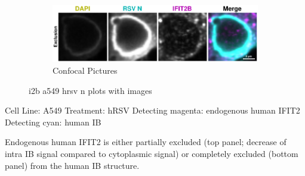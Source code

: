 \begin{figure}
    \begin{subfigure}{1\textwidth}
    \includegraphics[width=1\linewidth]{10. Chapter 5/Figs/01. Infection/02. IFIT2B/03. i2b a549 hrsv n.pdf} 
    \caption[]{Confocal Pictures}
    \end{subfigure}
    \caption[i2b a549 hrsv n plots with images]{i2b a549 hrsv n plots with images}
    \label{fig:i2b a549 hrsv n plots with images}
\end{figure}

Cell Line: A549 \newline
Treatment: hRSV \newline
Detecting magenta: endogenous human IFIT2  \newline
Detecting cyan: human IB \newline

Endogenous human IFIT2 is either partially excluded (top panel; decrease of intra IB signal compared to cytoplasmic signal) or completely excluded (bottom panel) from the human IB structure.


